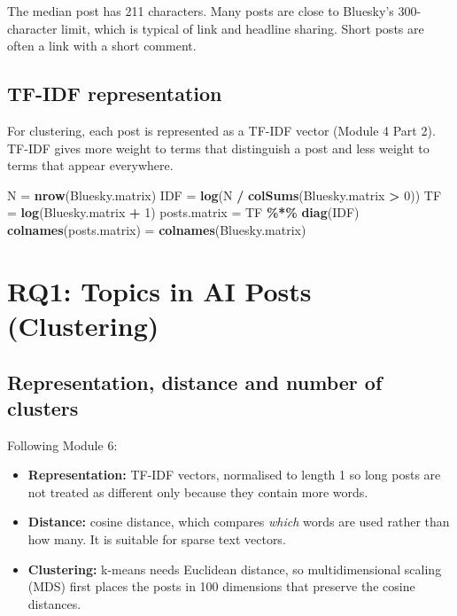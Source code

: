 \documentclass[
  10pt,
]{article}
\newenvironment{Shaded}{\begin{snugshade}}{\end{snugshade}}
\newcommand{\DecValTok}[1]{\textcolor[rgb]{0.00,0.00,0.81}{#1}}
\newcommand{\FunctionTok}[1]{\textcolor[rgb]{0.13,0.29,0.53}{\textbf{#1}}}
\newcommand{\NormalTok}[1]{#1}
\newcommand{\OtherTok}[1]{\textcolor[rgb]{0.56,0.35,0.01}{#1}}
\newcommand{\SpecialCharTok}[1]{\textcolor[rgb]{0.81,0.36,0.00}{\textbf{#1}}}
\providecommand{\tightlist}{%
  \setlength{\itemsep}{0pt}\setlength{\parskip}{0pt}}
\begin{document}
The median post has 211 characters. Many posts are close to Bluesky's
300-character limit, which is typical of link and headline sharing.
Short posts are often a link with a short comment.

\subsection{TF-IDF representation}\label{tf-idf-representation}

For clustering, each post is represented as a TF-IDF vector (Module 4
Part 2). TF-IDF gives more weight to terms that distinguish a post and
less weight to terms that appear everywhere.

\begin{Shaded}
\begin{Highlighting}[]
\NormalTok{N }\OtherTok{=} \FunctionTok{nrow}\NormalTok{(Bluesky.matrix)}
\NormalTok{IDF }\OtherTok{=} \FunctionTok{log}\NormalTok{(N }\SpecialCharTok{/} \FunctionTok{colSums}\NormalTok{(Bluesky.matrix }\SpecialCharTok{\textgreater{}} \DecValTok{0}\NormalTok{))}
\NormalTok{TF }\OtherTok{=} \FunctionTok{log}\NormalTok{(Bluesky.matrix }\SpecialCharTok{+} \DecValTok{1}\NormalTok{)}
\NormalTok{posts.matrix }\OtherTok{=}\NormalTok{ TF }\SpecialCharTok{\%*\%} \FunctionTok{diag}\NormalTok{(IDF)}
\FunctionTok{colnames}\NormalTok{(posts.matrix) }\OtherTok{=} \FunctionTok{colnames}\NormalTok{(Bluesky.matrix)}
\end{Highlighting}
\end{Shaded}

\section{RQ1: Topics in AI Posts
(Clustering)}\label{rq1-topics-in-ai-posts-clustering}

\subsection{Representation, distance and number of
clusters}\label{representation-distance-and-number-of-clusters}

Following Module 6:

\begin{itemize}
\tightlist
\item
  \textbf{Representation:} TF-IDF vectors, normalised to length 1 so
  long posts are not treated as different only because they contain more
  words.
\item
  \textbf{Distance:} cosine distance, which compares \emph{which} words
  are used rather than how many. It is suitable for sparse text vectors.
\item
  \textbf{Clustering:} k-means needs Euclidean distance, so
  multidimensional scaling (MDS) first places the posts in 100
  dimensions that preserve the cosine distances.
\end{itemize}
\end{document}
